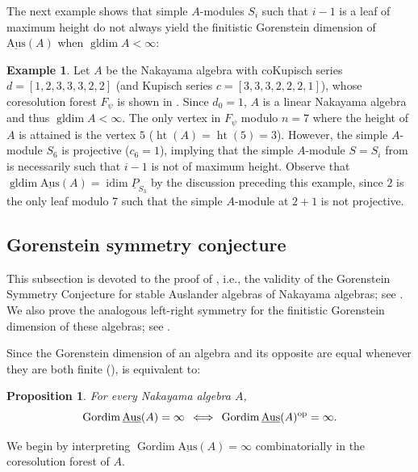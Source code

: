 \documentclass[a4paper]{amsart}
\newtheorem{proposition}[theorem]{Proposition}
\theoremstyle{definition}
\newtheorem{example}[theorem]{Example}
\theoremstyle{remark}
\numberwithin{equation}{theorem}
\newcommand{\sAus}{\operatorname{\underline{Aus}}}
\newcommand{\pstab}[1]{\underline{P}_{#1}}
\newcommand{\gordim}{\operatorname{Gordim}}
\newcommand{\height}{\operatorname{ht}}
\newcommand{\idim}{\operatorname{idim}}
\newcommand{\gldim}{\operatorname{gldim}}
\newcommand{\psiforest}{F_\psi}
\newcommand{\op}{\textnormal{op}}
\begin{document}
    The next example shows that simple $ A $-modules $ S_i $ such that $ i-1 $ is a leaf of maximum height do not always yield the finitistic Gorenstein dimension of $ \sAus(A) $ when $ \gldim A < \infty $:
    

    
\begin{example}
  Let $A$ be the Nakayama algebra with coKupisch series $ d = [1,2,3, \allowbreak 3, 3,2,2] $ (and Kupisch series $ c = [3,3,3,2,2,2,1] $), whose coresolution forest $\psiforest$ is shown in .
  Since $ d_0 = 1 $, $ A $ is a linear Nakayama algebra and thus $ \gldim A < \infty $.
    The only vertex in $ \psiforest $ modulo $  n=7 $ where the height of $ A $ is attained is the vertex $ 5 $ ($ \height(A) = \height(5) = 3 $). However, the simple $ A $-module $ S_6 $ is projective ($c_6 = 1$), implying that the simple $ A $-module $ S=S_i $ from  is necessarily such that $ i-1 $ is not of maximum height. 
    Observe that $ \gldim \sAus(A) = \idim \pstab{S_3} $ by the discussion preceding this example, since $ 2 $ is the only leaf modulo $ 7 $ such that the simple $ A $-module at $ 2+1 $ is not projective.
\end{example}

\subsection{Gorenstein symmetry conjecture}\label{sec:main-results-symmetry}
This subsection is devoted to the proof of , i.e., the validity of the Gorenstein Symmetry Conjecture for stable Auslander algebras of Nakayama algebras; see . We also prove the analogous left-right symmetry for the finitistic Gorenstein dimension of these algebras; see .

Since the Gorenstein dimension of an algebra and its opposite are equal whenever they are both finite (\cite[Lemma A]{Za}),  is equivalent to:
\begin{proposition}
    \label{proposition:Gorenstein:symmetry}
    For every Nakayama algebra $A$,
        \[
            \gordim \sAus (A) = \infty \, \iff \, \gordim \sAus (A)^\op = \infty .
        \]
\end{proposition}

We begin by interpreting $\gordim \sAus (A) = \infty$ combinatorially in the coresolution forest of $ A $.
\end{document}
